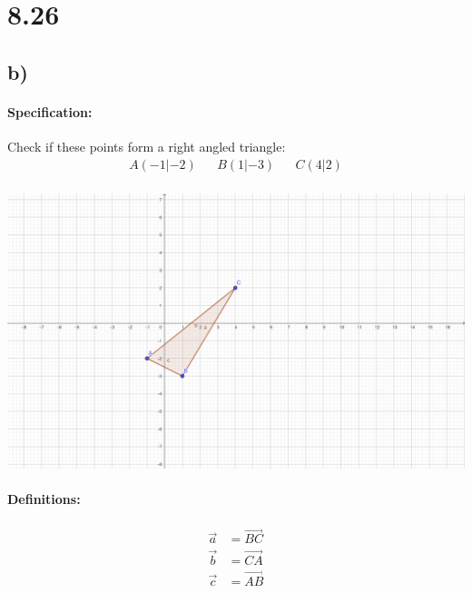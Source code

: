 \section{8.26}
\subsection{b)}
\paragraph{Specification:}
Check if these points form a right angled triangle:
\begin{align*}
    A(-1|-2) &&
    B(1|-3) &&
    C(4|2) \\[20pt]
\end{align*}

\includegraphics[width=\linewidth]{images/8-26-b.png}

\paragraph{Definitions:}
\begin{align*}
    \vec{a} &= \vec{BC} \\
    \vec{b} &= \vec{CA} \\
    \vec{c} &= \vec{AB} \\
\end{align*}

